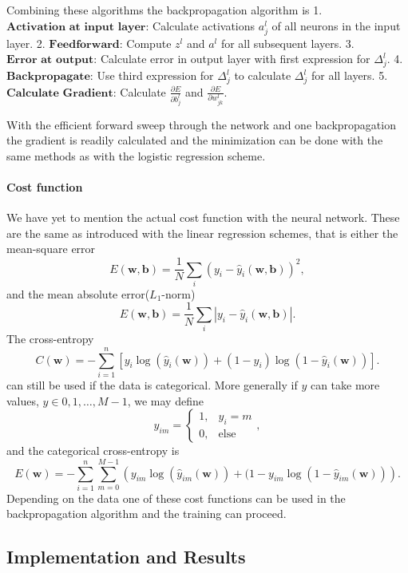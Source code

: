 \documentclass[10pt, t]{beamer}
\begin{document}
Combining these algorithms the backpropagation algorithm is 1.
\(\textbf{Activation at input layer}\): Calculate activations \(a^l_j\)
of all neurons in the input layer. 2. \(\textbf{Feedforward}\): Compute
\(z^l\) and \(a^l\) for all subsequent layers. 3.
\(\textbf{Error at output}\): Calculate error in output layer with first
expression for \(\Delta^l_j\). 4. \(\textbf{Backpropagate}\): Use third
expression for \(\Delta^l_j\) to calculate \(\Delta^l_j\) for all
layers. 5. \(\textbf{Calculate Gradient}\): Calculate
\(\frac{\partial E}{\partial b^l_j}\) and
\(\frac{\partial E}{\partial w^l_{jk}}\).

With the efficient forward sweep through the network and one
backpropagation the gradient is readily calculated and the minimization
can be done with the same methods as with the logistic regression
scheme.

\hypertarget{cost-function}{%
\paragraph{Cost function}\label{cost-function}}

We have yet to mention the actual cost function with the neural network.
These are the same as introduced with the linear regression schemes,
that is either the mean-square error
\[E(\boldsymbol{w},\boldsymbol{b}) = \frac{1}{N}\sum_i\left(y_i - \hat{y}_i(\boldsymbol{w},\boldsymbol{b})\right)^2,\]
and the mean absolute error(\(L_1\)-norm)
\[E(\boldsymbol{w},\boldsymbol{b}) = \frac{1}{N}\sum_i\left|y_i - \hat{y}_i(\boldsymbol{w},\boldsymbol{b})\right|.\]
The cross-entropy
\[C(\boldsymbol{w}) = -\sum\limits_{i=1}^n \left[y_i\log\left(\hat{y}_i(\boldsymbol{w})\right) + (1 - y_i)\log\left(1 - \hat{y}_i(\boldsymbol{w})\right)\right].\]
can still be used if the data is categorical. More generally if \(y\)
can take more values, \(y\in{0,1,\dots,M-1}\), we may define
\[y_{im} = \left\{\begin{matrix}
        1,& y_i = m \\
        0,& \text{else}
    \end{matrix}\right.,\] and the categorical cross-entropy is
\[E(\boldsymbol{w}) = -\sum_{i=1}^n \sum_{m=0}^{M-1}\left(y_{im} \log\left(\hat{y}_{im}(\boldsymbol{w})\right) + (1 - y_{im} \log\left(1 - \hat{y}_{im}(\boldsymbol{w})\right)\right).\]
Depending on the data one of these cost functions can be used in the
backpropagation algorithm and the training can proceed.

    \hypertarget{implementation-and-results}{%
\subsection{Implementation and
Results}\label{implementation-and-results}}
\end{document}

